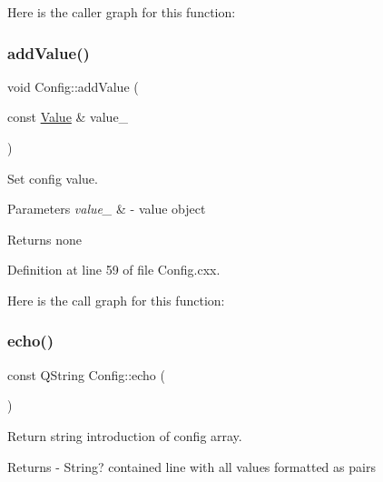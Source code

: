 Here is the caller graph for this function\+:
\mbox{\label{classeven_1_1_config_af024790ddfa56faacc4110df84a3d8c7}} 
\subsubsection{\texorpdfstring{add\+Value()}{addValue()}\hspace{0.1cm}{\footnotesize\ttfamily [2/2]}}
{\footnotesize\ttfamily void Config\+::add\+Value (\begin{DoxyParamCaption}\item[{const \mbox{\hyperlink{classeven_1_1_value}{Value}} \&}]{value\+\_\+ }\end{DoxyParamCaption})}



Set config value. 


\begin{DoxyParams}{Parameters}
{\em value\+\_\+} & -\/ value object \\
\hline
\end{DoxyParams}
\begin{DoxyReturn}{Returns}
none 
\end{DoxyReturn}


Definition at line 59 of file Config.\+cxx.

Here is the call graph for this function\+:
\mbox{\label{classeven_1_1_config_a648fc2031b84927f096cc5bff536383d}} 
\subsubsection{\texorpdfstring{echo()}{echo()}}
{\footnotesize\ttfamily const Q\+String Config\+::echo (\begin{DoxyParamCaption}{ }\end{DoxyParamCaption})}



Return string introduction of config array. 

\begin{DoxyReturn}{Returns}
-\/ String? contained line with all values formatted as pairs 
\end{DoxyReturn}


